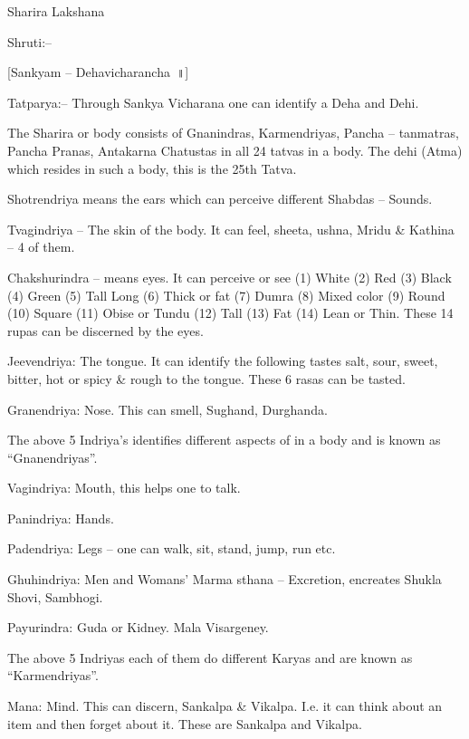 Sharira Lakshana

Shruti:–

[Sankyam – Dehavicharancha~॥]

Tatparya:– Through Sankya Vicharana one can identify a Deha and Dehi.

The Sharira or body consists of Gnanindras, Karmendriyas, Pancha – tanmatras, Pancha Pranas, Antakarna Chatustas in all 24 tatvas in a body. The dehi (Atma) which resides in such a body, this is the 25th Tatva.

\item Shotrendriya means the ears which can perceive different Shabdas – Sounds.

 \item Tvagindriya – The skin of the body. It can feel, sheeta, ushna, Mridu \& Kathina – 4 of them.

 \item Chakshurindra – means eyes. It can perceive or see (1) White (2) Red (3) Black (4) Green (5) Tall Long (6) Thick or fat (7) Dumra (8) Mixed color (9) Round (10) Square (11) Obise or Tundu (12) Tall (13) Fat (14) Lean or Thin. These 14 rupas can be discerned by the eyes.

 \item Jeevendriya: The tongue. It can identify the following tastes salt, sour, sweet, bitter, hot or spicy \& rough to the tongue. These 6 rasas can be tasted.

 \item Granendriya: Nose. This can smell, Sughand, Durghanda.

The above 5 Indriya's identifies different aspects of in a body and is known as “Gnanendriyas”.

\item Vagindriya: Mouth, this helps one to talk.

 \item Panindriya: Hands.

 \item Padendriya: Legs – one can walk, sit, stand, jump, run etc.

 \item Ghuhindriya: Men and Womans' Marma sthana – Excretion, encreates Shukla Shovi, Sambhogi.

 \item Payurindra: Guda or Kidney. Mala Visargeney.

The above 5 Indriyas each of them do different Karyas and are known as “Karmendriyas”.

\item Mana: Mind. This can discern, Sankalpa \& Vikalpa. I.e. it can think about an item and then forget about it. These are Sankalpa and Vikalpa.

